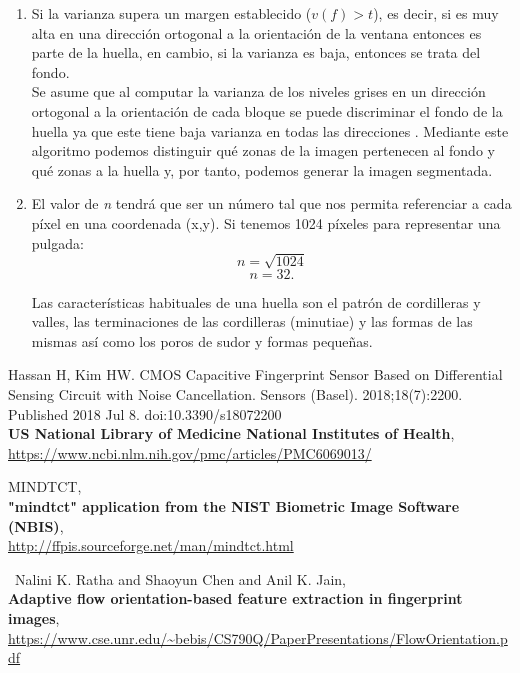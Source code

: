 \documentclass[10pt,a4paper]{article}
\begin{document}
\begin{enumerate}[label=\textbf{\alph*)}]
\item
Si la varianza supera un margen establecido ($ v(f) > t$), es decir, si es muy alta en una dirección ortogonal a la orientación de la ventana entonces es parte de la huella, en cambio, si la varianza es baja, entonces se trata del fondo.\\

Se asume que al computar la varianza de los niveles grises en un dirección ortogonal a la orientación de cada bloque se puede discriminar el fondo de la huella ya que este tiene baja varianza en todas las direcciones \cite{ratha}. Mediante este algoritmo podemos distinguir qué zonas de la imagen pertenecen al fondo y qué zonas a la huella y, por tanto, podemos generar la imagen segmentada.

\item El valor de \textit{n} tendrá que ser un número tal que nos permita referenciar a cada píxel en una coordenada (x,y). Si tenemos 1024 píxeles para representar una pulgada:
\[
  n = \sqrt{1024} 
\]
\[  
  n = 32.
\]

Las características habituales de una huella son el patrón de cordilleras y valles, las terminaciones de las cordilleras (minutiae) y las formas de las mismas así como los poros de sudor y formas pequeñas.

\end{enumerate}

\pagebreak
\begin{thebibliography}{9}

Hassan H, Kim HW. CMOS Capacitive Fingerprint Sensor Based on Differential Sensing Circuit with Noise Cancellation. Sensors (Basel). 2018;18(7):2200. Published 2018 Jul 8. doi:10.3390/s18072200\\
\textbf{US National Library of Medicine National Institutes of Health},\\
  \url{https://www.ncbi.nlm.nih.gov/pmc/articles/PMC6069013/}
  
  MINDTCT,\\
  \textbf{"mindtct" application from the NIST Biometric Image Software (NBIS)},\\
  \url{http://ffpis.sourceforge.net/man/mindtct.html}

\
  Nalini K. Ratha and Shaoyun Chen and Anil K. Jain,\\
  \textbf{Adaptive flow orientation-based feature extraction in fingerprint images},\\
  \url{https://www.cse.unr.edu/~bebis/CS790Q/PaperPresentations/FlowOrientation.pdf}
  
\end{thebibliography}
\end{document}
